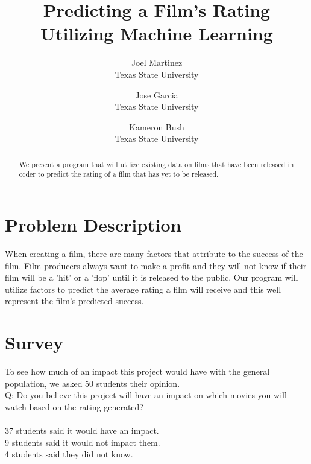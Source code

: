 \documentclass[10pt,twocolumn,letterpaper]{article}
\begin{document}
\title{Predicting a Film's Rating Utilizing Machine Learning}

\author{Joel Martinez\\
Texas State University\\
\and
Jose Garcia\\
Texas State University\\
\and
Kameron Bush\\
Texas State University\\
}
\maketitle

\begin{abstract}
   We present a program that will utilize existing data on films that have been released in order to predict the rating of a film that has yet to be released.
\end{abstract}

\section{Problem Description}
	When creating a film, there are many factors that attribute to the success of the film. Film producers always want to make a profit and they will not know if their film will be a 'hit' or a 'flop' until it is released to the public. Our program will utilize factors to predict the average rating a film will receive and this well represent the film's predicted success.

\section{Survey}
	To see how much of an impact this project would have with the general population, we asked 50 students their opinion.\\
Q: Do you believe this project will have an impact on which movies you will watch based on the rating generated?\\ \\37 students said it would have an impact.\\
9 students said it would not impact them.\\
4 students said they did not know.

\end{document}
